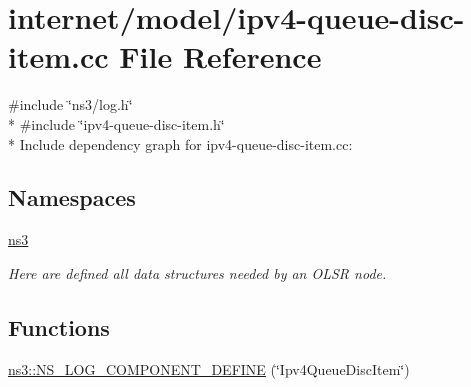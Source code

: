 \hypertarget{ipv4-queue-disc-item_8cc}{}\section{internet/model/ipv4-\/queue-\/disc-\/item.cc File Reference}
\label{ipv4-queue-disc-item_8cc}
{\ttfamily \#include \char`\"{}ns3/log.\+h\char`\"{}}\\*
{\ttfamily \#include \char`\"{}ipv4-\/queue-\/disc-\/item.\+h\char`\"{}}\\*
Include dependency graph for ipv4-\/queue-\/disc-\/item.cc\+:
\subsection*{Namespaces}
\begin{DoxyCompactItemize}
\item 
 \hyperlink{namespacens3}{ns3}
\begin{DoxyCompactList}\small\item\em Here are defined all data structures needed by an O\+L\+SR node. \end{DoxyCompactList}\end{DoxyCompactItemize}
\subsection*{Functions}
\begin{DoxyCompactItemize}
\item 
\hyperlink{namespacens3_a2e60661686f82a6debda6be2a61df3d9}{ns3\+::\+N\+S\+\_\+\+L\+O\+G\+\_\+\+C\+O\+M\+P\+O\+N\+E\+N\+T\+\_\+\+D\+E\+F\+I\+NE} (\char`\"{}Ipv4\+Queue\+Disc\+Item\char`\"{})
\end{DoxyCompactItemize}
